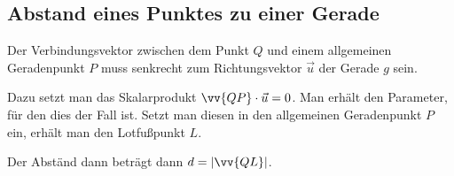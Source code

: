 \documentclass{article}
\begin{document}
\subsection{Abstand eines Punktes zu einer Gerade}
\label{abstandpunktgerade}
Der Verbindungsvektor zwischen dem Punkt $Q$ und einem allgemeinen Geradenpunkt $P$ 
muss senkrecht zum Richtungsvektor $\vec{u}$ der Gerade $g$ sein.

Dazu setzt man das Skalarprodukt $\vv{QP}\cdot \vec{u} = 0$. 
Man erhält den Parameter, für den dies der Fall ist.
Setzt man diesen in den allgemeinen Geradenpunkt $P$ ein, erhält man den Lotfußpunkt $L$.

Der Abständ dann beträgt dann $d = |\vv{QL}|$.
\begin{figure}[H]
    \centering
{}
\end{figure}
\end{document}
